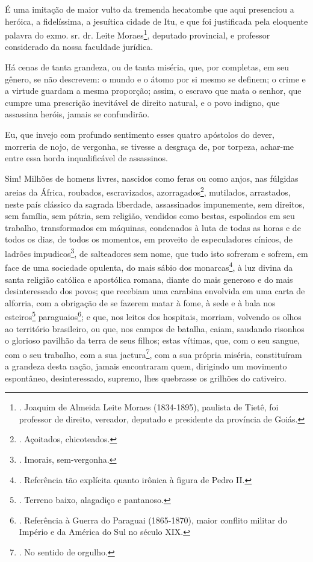 É uma imitação de maior vulto da tremenda hecatombe que aqui presenciou
a heróica, a fidelíssima, a jesuítica cidade de Itu, e que foi
justificada pela eloquente palavra do exmo. sr. dr. Leite
Moraes\footnote{. Joaquim de Almeida Leite Moraes (1834-1895), paulista
  de Tietê, foi professor de direito, vereador, deputado e presidente da
  província de Goiás.}, deputado provincial, e professor considerado da
nossa faculdade jurídica.

Há cenas de tanta grandeza, ou de tanta miséria, que, por completas, em
seu gênero, se não descrevem: o mundo e o átomo por si mesmo se definem;
o crime e a virtude guardam a mesma proporção; assim, o escravo que mata
o senhor, que cumpre uma prescrição inevitável de direito natural, e o
povo indigno, que assassina heróis, jamais se confundirão.

Eu, que invejo com profundo sentimento esses quatro apóstolos do dever,
morreria de nojo, de vergonha, se tivesse a desgraça de, por torpeza,
achar-me entre essa horda inqualificável de assassinos.

Sim! Milhões de homens livres, nascidos como feras ou como anjos, nas
fúlgidas areias da África, roubados, escravizados, azorragados\footnote{.
  Açoitados, chicoteados.}, mutilados, arrastados, neste país clássico
da sagrada liberdade, assassinados impunemente, sem direitos, sem
família, sem pátria, sem religião, vendidos como bestas, espoliados em
seu trabalho, transformados em máquinas, condenados à luta de todas as
horas e de todos os dias, de todos os momentos, em proveito de
especuladores cínicos, de ladrões impudicos\footnote{. Imorais,
  sem-vergonha.}, de salteadores sem nome, que tudo isto sofreram e
sofrem, em face de uma sociedade opulenta, do mais sábio dos
monarcas\footnote{. Referência tão explícita quanto irônica à figura de
  Pedro II.}, à luz divina da santa religião católica e apostólica
romana, diante do mais generoso e do mais desinteressado dos povos; que
recebiam uma carabina envolvida em uma carta de alforria, com a
obrigação de se fazerem matar à fome, à sede e à bala nos
esteiros\footnote{. Terreno baixo, alagadiço e pantanoso.}
paraguaios\footnote{. Referência à Guerra do Paraguai (1865-1870), maior
  conflito militar do Império e da América do Sul no século XIX.}; e
que, nos leitos dos hospitais, morriam, volvendo os olhos ao território
brasileiro, ou que, nos campos de batalha, caiam, saudando risonhos o
glorioso pavilhão da terra de seus filhos; estas vítimas, que, com o seu
sangue, com o seu trabalho, com a sua jactura\footnote{. No sentido de
  orgulho.}, com a sua própria miséria, constituíram a grandeza desta
nação, jamais encontraram quem, dirigindo um movimento espontâneo,
desinteressado, supremo, lhes quebrasse os grilhões do cativeiro.

